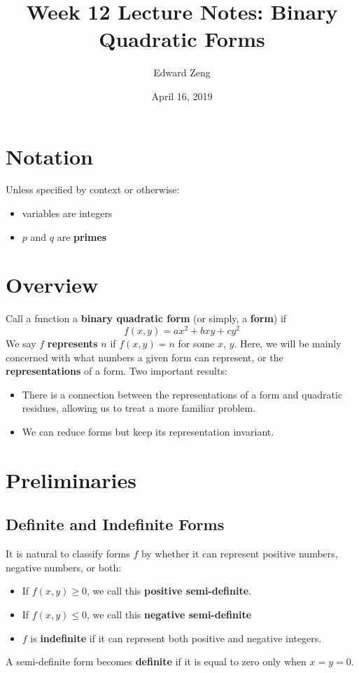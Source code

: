 \documentclass[12pt]{article}
\title{Week 12 Lecture Notes: Binary Quadratic Forms}
\author{Edward Zeng}
\date{April 16, 2019}
\begin{document}
\maketitle

\section{Notation}
Unless specified by context or otherwise:
\begin{itemize}
    \item variables are integers
    \item $p$ and $q$ are \textbf{primes}
\end{itemize}

\section{Overview}
Call a function a \textbf{binary quadratic form} (or simply, a \textbf{form}) if
\begin{equation}
    f(x,y) = ax^{2} + bxy + cy^{2}
\end{equation}
We say $f$ \textbf{represents} $n$ if $f(x,y) = n$ for some $x$, $y$. Here, we will be mainly concerned with what numbers a given form can represent, or the \textbf{representations} of a form. Two important results:
\begin{itemize}
    \item There is a connection between the representations of a form and quadratic residues, allowing us to treat a more familiar problem.
    \item We can reduce forms but keep its representation invariant.
\end{itemize}

\section{Preliminaries}
\subsection{Definite and Indefinite Forms}
It is natural to classify forms $f$ by whether it can represent positive numbers, negative numbers, or both:
\begin{itemize}
    \item If $f(x,y) \geq 0$, we call this \textbf{positive semi-definite}.
    \item If $f(x,y) \leq 0$, we call this \textbf{negative semi-definite}
    \item $f$ is \textbf{indefinite} if it can represent both positive and negative integers.
\end{itemize}
A semi-definite form becomes \textbf{definite} if it is equal to zero only when $x = y = 0$.
\end{document}
